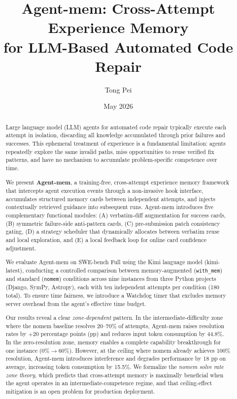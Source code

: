 \documentclass{article}
\title{Agent-mem: Cross-Attempt Experience Memory\\for LLM-Based Automated Code Repair}
\author{Tong Pei}
\date{May 2026}
\begin{document}
\maketitle

\begin{abstract}
Large language model (LLM) agents for automated code repair typically execute each attempt in isolation, discarding all knowledge accumulated through prior failures and successes. This ephemeral treatment of experience is a fundamental limitation: agents repeatedly explore the same invalid paths, miss opportunities to reuse verified fix patterns, and have no mechanism to accumulate problem-specific competence over time.

We present \textbf{Agent-mem}, a training-free, cross-attempt experience memory framework that intercepts agent execution events through a non-invasive hook interface, accumulates structured memory cards between independent attempts, and injects contextually retrieved guidance into subsequent runs. Agent-mem introduces five complementary functional modules: (A) verbatim-diff augmentation for success cards, (B) symmetric failure-side anti-pattern cards, (C) pre-submission patch consistency gating, (D) a strategy scheduler that dynamically allocates between verbatim reuse and local exploration, and (E) a local feedback loop for online card confidence adjustment.

We evaluate Agent-mem on SWE-bench Full using the Kimi language model (kimi-latest), conducting a controlled comparison between memory-augmented (\texttt{with\_mem}) and standard (\texttt{nomem}) conditions across nine instances from three Python projects (Django, SymPy, Astropy), each with ten independent attempts per condition (180 total). To ensure time fairness, we introduce a Watchdog timer that excludes memory server overhead from the agent's effective time budget.

Our results reveal a clear \emph{zone-dependent} pattern. In the intermediate-difficulty zone where the nomem baseline resolves 20--70\% of attempts, Agent-mem raises resolution rates by $+$20 percentage points (pp) and reduces input token consumption by 44.8\%. In the zero-resolution zone, memory enables a complete capability breakthrough for one instance (0\%$\to$60\%). However, at the ceiling where nomem already achieves 100\% resolution, Agent-mem introduces interference and degrades performance by 18 pp on average, increasing token consumption by 15.5\%. We formalize the \emph{nomem solve rate zone theory}, which predicts that cross-attempt memory is maximally beneficial when the agent operates in an intermediate-competence regime, and that ceiling-effect mitigation is an open problem for production deployment.
\end{abstract}
\end{document}

